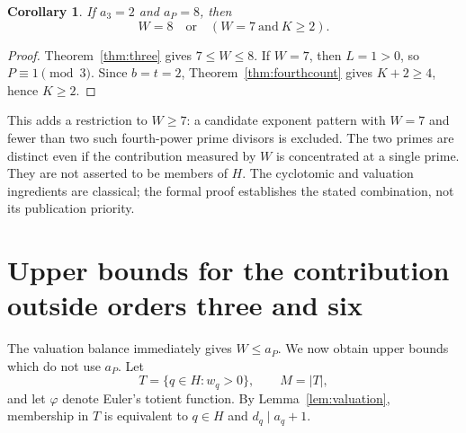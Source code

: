 \documentclass[11pt]{article}
\newtheorem{corollary}[theorem]{Corollary}
\theoremstyle{remark}
\begin{document}
\begin{corollary}\label{cor:eightfourth}
If $a_3=2$ and $a_P=8$, then
\[
 \boxed{W=8\quad\text{or}\quad(W=7\ \text{and}\ K\ge2).}
\]
\end{corollary}
\begin{proof}
Theorem~\ref{thm:three} gives $7\le W\le8$. If $W=7$, then $L=1>0$,
so $P\equiv1\pmod3$. Since $b=t=2$, Theorem~\ref{thm:fourthcount} gives
$K+2\ge4$, hence $K\ge2$.
\end{proof}

This adds a restriction to $W\ge7$: a candidate exponent pattern with
$W=7$ and fewer than two such fourth-power prime divisors is excluded.
The two primes are distinct even if the contribution measured by $W$ is
concentrated at a single prime. They are not asserted to be members of $H$.
The cyclotomic and valuation ingredients are classical; the formal proof
establishes the stated combination, not its publication priority.

\section{Upper bounds for the contribution outside orders three and six}\label{sec:upper}

The valuation balance immediately gives $W\le a_P$. We now obtain upper bounds
which do not use $a_P$. Let
\[
 T=\{q\in H:w_q>0\},\qquad M=|T|,
\]
and let $\varphi$ denote Euler's totient function. By Lemma~\ref{lem:valuation},
membership in $T$ is equivalent to $q\in H$ and $d_q\mid a_q+1$.
\end{document}
